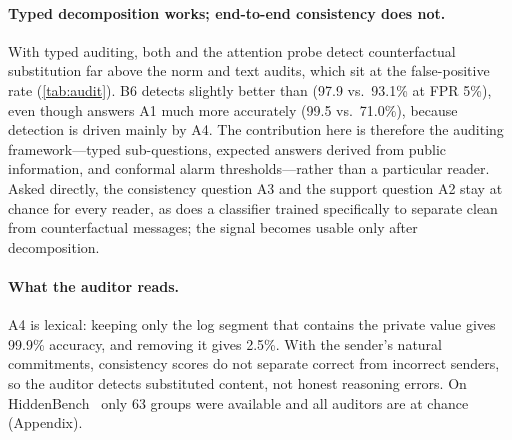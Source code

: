 \paragraph{Typed decomposition works; end-to-end consistency does not.} With typed auditing, both \clr{} and the attention probe detect counterfactual substitution far above the norm and text audits, which sit at the false-positive rate (\cref{tab:audit}). B6 detects slightly better than \clr{} (97.9 vs.\ 93.1\% at FPR 5\%), even though \clr{} answers A1 much more accurately (99.5 vs.\ 71.0\%), because detection is driven mainly by A4. The contribution here is therefore the auditing framework---typed sub-questions, expected answers derived from public information, and conformal alarm thresholds---rather than a particular reader. Asked directly, the consistency question A3 and the support question A2 stay at chance for every reader, as does a classifier trained specifically to separate clean from counterfactual messages; the signal becomes usable only after decomposition.

\paragraph{What the auditor reads.} A4 is lexical: keeping only the log segment that contains the private value gives 99.9\% accuracy, and removing it gives 2.5\%. With the sender's natural commitments, consistency scores do not separate correct from incorrect senders, so the auditor detects substituted content, not honest reasoning errors. On HiddenBench~\cite{hiddenbench} only 63 groups were available and all auditors are at chance (Appendix).

